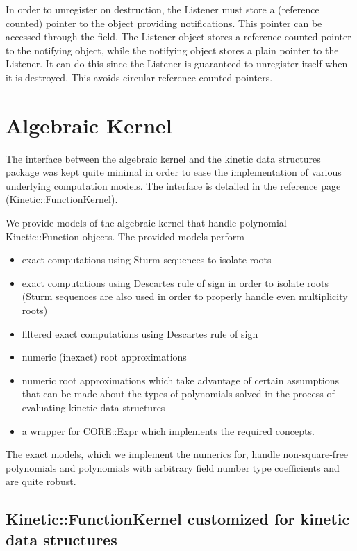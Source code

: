 In order to unregister on destruction, the Listener must store a
(reference counted) pointer to the object providing
notifications. This pointer can be accessed through the 
field. The Listener object stores a reference counted pointer to
the notifying object, while the notifying object stores a plain
pointer to the Listener. It can do this since the Listener
is guaranteed to unregister itself when it is destroyed. This avoids
circular reference counted pointers.

\section{Algebraic Kernel}
\label{algebraic_kernel}

The interface between the algebraic kernel and the kinetic data
structures package was kept quite minimal in order to ease the
implementation of various underlying computation models. The interface
is detailed in the reference page (Kinetic::FunctionKernel).

We provide models of the algebraic kernel that handle polynomial
Kinetic::Function objects. The provided models perform
\begin{itemize}
\item exact computations using Sturm sequences to isolate roots
\item exact computations using Descartes rule of sign in order to
isolate roots (Sturm sequences are also used in order to properly
handle even multiplicity roots)
\item filtered exact computations using Descartes rule of sign
\item numeric (inexact) root approximations
\item numeric root approximations which take advantage of certain
assumptions that can be made about the types of polynomials solved in
the process of evaluating kinetic data structures
\item a wrapper for CORE::Expr which implements the required
  concepts.
\end{itemize}
The exact models, which we implement the numerics for, handle
non-square-free polynomials and polynomials with arbitrary field
number type coefficients and are quite robust.


\subsection{Kinetic::FunctionKernel customized for kinetic data structures}

